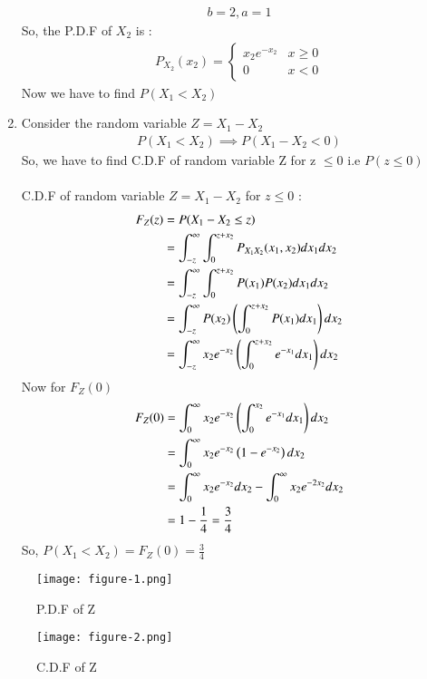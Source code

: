 \documentclass[journal,12pt,twocolumn]{IEEEtran}
\begin{document}
\begin{enumerate}
  \begin{align}
      b=2,a=1
  \end{align}
  So, the P.D.F of $X_2$ is :
  \begin{align}
      P_{X_2}(x_2)=
      \begin{cases}
          x_2e^{-x_2} & x\geq 0 \\
          0 & x<0
      \end{cases}
  \end{align}
  Now we have to find $P(X_1<X_2)$\\
  \item Consider the random variable $Z=X_1-X_2$\\
  \begin{align}
 P(X_1<X_2)\implies P(X_1-X_2<0)
  \end{align}
  So, we have to find C.D.F of random variable Z for z $\leq 0$ i.e $P(z\leq 0)$\\ 
  \\C.D.F of random variable $Z=X_1-X_2$ for $z\leq 0$ :
\begin{align}
      F_Z(z) &=P(X_1-X_2 \leq z)\\
       &=\int_{-z}^\infty \int_{0}^{z+x_2}P_{X_1X_2}(x_1,x_2) dx_1 dx_2\\
       &=\int_{-z}^\infty \int_{0}^{z+x_2}P(x_1)P(x_2) dx_1dx_2\\
       &=\int_{-z}^\infty P(x_2)\left( \int_{0}^{z+x_2}P(x_1) dx_1\right) dx_2\\
       &=\int_{-z}^\infty x_2 e^{-x_2} \left(\int_{0}^{z+x_2}e^{-x_1}dx_1\right)dx_2
  \end{align}
  Now for $F_Z(0)$
  \begin{align}
  \begin{split}
      F_Z(0)&=\int_{0}^\infty x_2 e^{-x_2} \left(\int_{0}^{x_2}e^{-x_1}dx_1\right)dx_2\\
      &=\int_{0}^\infty x_2 e^{-x_2} \left(1-e^{-x_2}\right)dx_2\\
      &=\int_{0}^\infty x_2 e^{-x_2}dx_2-\int_{0}^\infty x_2e^{-2x_2} dx_2\\
      &=1-\frac{1}{4}=\frac{3}{4}
      \end{split}
  \end{align}
  So, $P(X_1<X_2)=F_Z(0)=\frac{3}{4}$
\end{enumerate}

\begin{figure}[h]
    \begin{center}
    \texttt{[image: figure-1.png]}
    \end{center}
    \caption{P.D.F of Z}\label{Fig 1:}
\end{figure}
\begin{figure}[h]
   \begin{center}
    \texttt{[image: figure-2.png]}
    \end{center}
   \caption{C.D.F of Z}\label{Fig2:}
\end{figure}
\end{document}

